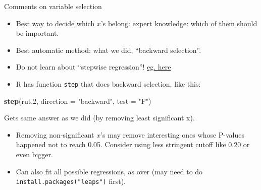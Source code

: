 \documentclass[ignorenonframetext,]{beamer}
\newenvironment{Shaded}{\begin{snugshade}}{\end{snugshade}}
\newcommand{\DataTypeTok}[1]{\textcolor[rgb]{0.13,0.29,0.53}{#1}}
\newcommand{\FloatTok}[1]{\textcolor[rgb]{0.00,0.00,0.81}{#1}}
\newcommand{\KeywordTok}[1]{\textcolor[rgb]{0.13,0.29,0.53}{\textbf{#1}}}
\newcommand{\NormalTok}[1]{#1}
\newcommand{\StringTok}[1]{\textcolor[rgb]{0.31,0.60,0.02}{#1}}
\providecommand{\tightlist}{%
  \setlength{\itemsep}{0pt}\setlength{\parskip}{0pt}}
\begin{document}
\begin{frame}[fragile]{Comments on variable selection}
\protect\hypertarget{comments-on-variable-selection}{}

\begin{itemize}
\tightlist
\item
  Best way to decide which \(x\)'s belong: expert knowledge: which of
  them should be important.
\item
  Best automatic method: what we did, ``backward selection''.
\item
  Do not learn about ``stepwise regression''!
  \href{https://towardsdatascience.com/stopping-stepwise-why-stepwise-selection-is-bad-and-what-you-should-use-instead-90818b3f52df}{eg.
  here}
\item
  R has function \texttt{step} that does backward selection, like this:
\end{itemize}

\begin{Shaded}
\begin{Highlighting}[]
\KeywordTok{step}\NormalTok{(rut}\FloatTok{.2}\NormalTok{, }\DataTypeTok{direction =} \StringTok{"backward"}\NormalTok{, }\DataTypeTok{test =} \StringTok{"F"}\NormalTok{)}
\end{Highlighting}
\end{Shaded}

Gets same answer as we did (by removing least significant x).

\begin{itemize}
\tightlist
\item
  Removing non-significant \(x\)'s may remove interesting ones whose
  P-values happened not to reach 0.05. Consider using less stringent
  cutoff like 0.20 or even bigger.
\item
  Can also fit all possible regressions, as over (may need to do
  \texttt{install.packages("leaps")} first).
\end{itemize}

\end{frame}
\end{document}
